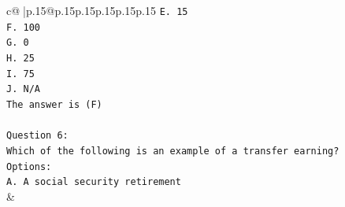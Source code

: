 \documentclass{article}
\begin{document}
{\begin{supertabular}{c@{$\;$}|p{.15\linewidth}@{}p{.15\linewidth}p{.15\linewidth}p{.15\linewidth}p{.15\linewidth}p{.15\linewidth}}
{{{\texttt{E. 15} \\
\texttt{F. 100} \\
\texttt{G. 0} \\
\texttt{H. 25} \\
\texttt{I. 75} \\
\texttt{J. N/A} \\
\texttt{The answer is (F)} \\
\\ 
\texttt{Question 6:} \\
\texttt{Which of the following is an example of a transfer earning?} \\
\texttt{Options:} \\
\texttt{A. A social security retirement} \\
            }
        }
    }
    & \\ \\

\end{supertabular}
}
\end{document}
